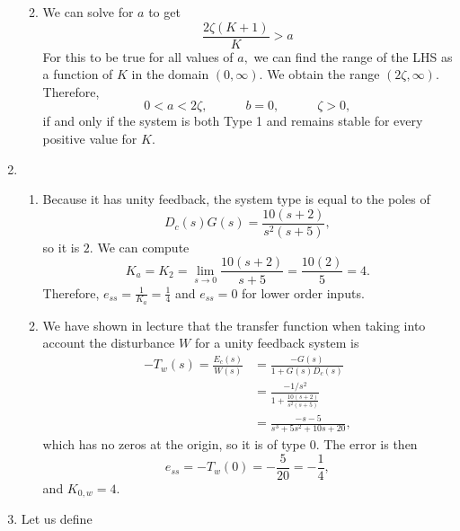 \documentclass{article}
\numberwithin{equation}{section}
\begin{document}
\begin{enumerate}[label=\textbf{2.\arabic*}]
\begin{enumerate}[label=(\alph*)]
\begin{equation}
        \end{equation}
        \item We can solve for $a$ to get 
        \begin{equation}
            \frac{2\zeta(K+1)}{K} > a
        \end{equation}
        For this to be true for all values of $a,$ we can find the range of the LHS as a function of $K$ in the domain $(0,\infty).$ We obtain the range $(2\zeta,\infty).$ Therefore,
        \begin{equation}
            0 < a < 2\zeta,\quad\quad\quad b=0,\quad\quad\quad \zeta>0,
        \end{equation} 
        if and only if the system is both Type 1 and remains stable for every positive value for $K.$
    \end{enumerate}
    \item \begin{enumerate}[label=(\alph*)]
        \item Because it has unity feedback, the system type is equal to the poles of 
        \begin{equation}
            D_c(s)G(s) = \frac{10(s+2)}{s^2(s+5)},
        \end{equation} 
        so it is $2.$ We can compute 
        \begin{equation}
            K_a = K_2 = \lim_{s\to 0} \frac{10(s+2)}{s+5} = \frac{10(2)}{5} = 4.
        \end{equation}
        Therefore, $e_{ss} = \frac{1}{K_a} = \frac{1}{4}$ and $e_{ss}=0$ for lower order inputs.
        \item We have shown in lecture that the transfer function when taking into account the disturbance $W$ for a unity feedback system is 
        \begin{align}
            -T_w(s) = \frac{E_c(s)}{W(s)} &= \frac{-G(s)}{1+G(s)D_c(s)} \\ 
            &= \frac{-1/s^2}{1+\frac{10(s+2)}{s^2(s+5)}} \\ 
            &= \frac{- s - 5}{s^{3} + 5 s^{2} + 10 s + 20},
        \end{align}
        which has no zeros at the origin, so it is of type 0. The error is then 
        \begin{equation}
            e_{ss} = -T_w(0) = -\frac{5}{20} = -\frac{1}{4},
        \end{equation}
        and $K_{0,w}=4.$
    \end{enumerate}
    \item Let us define 

\end{enumerate}
\end{document}

